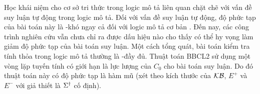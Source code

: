 \begin{Remark}
Học khái niệm cho cơ sở tri thức trong logic mô tả liên quan chặt chẽ với vấn đề suy luận tự động trong logic mô tả. Đối với vấn đề suy luận tự động, độ phức tạp của bài toán này là \EXPTIME-khó ngay cả đối với logic mô tả cơ bản \ALC. Đến nay, các công trình nghiên cứu vẫn chưa chỉ ra được dấu hiệu nào cho thấy có thể hy vọng làm giảm độ phức tạp của bài toán suy luận. Một cách tổng quát, bài toán 
kiểm tra tính thỏa trong logic mô tả thường là \EXPTIME-đầy đủ.
Thuật toán BBCL2 sử dụng một vòng lặp tuyến tính có giới hạn là lực lượng của $C_0$ cho bài toán suy luận. Do đó thuật toán này có độ phức tạp là hàm mũ (xét theo kích thước của $\mathcal{KB}$, $E^+$ và $E^-$ với giả thiết là $\Sigma^\dag$ cố định).\myend
\end{Remark}

